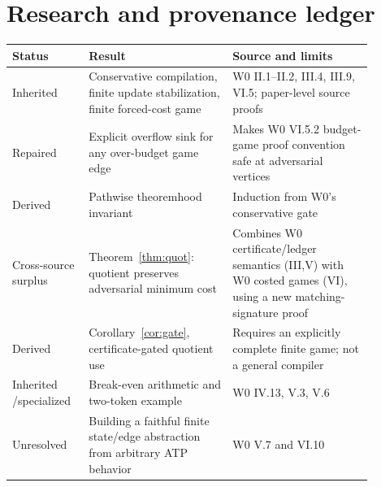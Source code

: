 \documentclass[11pt,letterpaper]{article}
\theoremstyle{definition}
\theoremstyle{remark}
\begin{document}
\section{Research and provenance ledger}
\small
\begin{longtable}{p{0.17\linewidth}p{0.36\linewidth}p{0.35\linewidth}}
\toprule Status & Result & Source and limits \\\midrule\endhead
Inherited & Conservative compilation, finite update stabilization, finite forced-cost game & W0 II.1--II.2, III.4, III.9, VI.5; paper-level source proofs \\
Repaired & Explicit overflow sink for any over-budget game edge & Makes W0 VI.5.2 budget-game proof convention safe at adversarial vertices \\
Derived & Pathwise theoremhood invariant & Induction from W0's conservative gate \\
Cross-source surplus & Theorem~\ref{thm:quot}: quotient preserves adversarial minimum cost & Combines W0 certificate/ledger semantics (III,V) with W0 costed games (VI), using a new matching-signature proof \\
Derived & Corollary~\ref{cor:gate}, certificate-gated quotient use & Requires an explicitly complete finite game; not a general compiler \\
Inherited /\newline specialized & Break-even arithmetic and two-token example & W0 IV.13, V.3, V.6 \\
Unresolved & Building a faithful finite state/edge abstraction from arbitrary ATP behavior & W0 V.7 and VI.10 \\
\bottomrule
\end{longtable}
\normalsize
\end{document}
